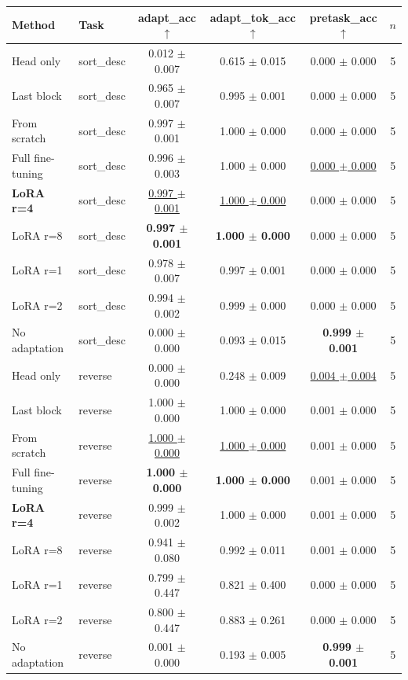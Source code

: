 \begin{tabular}{llcccc}
\toprule
Method & Task & adapt\_acc $\uparrow$ & adapt\_tok\_acc $\uparrow$ & pretask\_acc $\uparrow$ & $n$ \\
\midrule
Head only & sort\_desc & 0.012 $\pm$ 0.007 & 0.615 $\pm$ 0.015 & 0.000 $\pm$ 0.000 & 5 \\
Last block & sort\_desc & 0.965 $\pm$ 0.007 & 0.995 $\pm$ 0.001 & 0.000 $\pm$ 0.000 & 5 \\
From scratch & sort\_desc & 0.997 $\pm$ 0.001 & 1.000 $\pm$ 0.000 & 0.000 $\pm$ 0.000 & 5 \\
Full fine-tuning & sort\_desc & 0.996 $\pm$ 0.003 & 1.000 $\pm$ 0.000 & \underline{0.000 $\pm$ 0.000} & 5 \\
\textbf{LoRA r=4} & sort\_desc & \underline{0.997 $\pm$ 0.001} & \underline{1.000 $\pm$ 0.000} & 0.000 $\pm$ 0.000 & 5 \\
LoRA r=8 & sort\_desc & \textbf{0.997 $\pm$ 0.001} & \textbf{1.000 $\pm$ 0.000} & 0.000 $\pm$ 0.000 & 5 \\
LoRA r=1 & sort\_desc & 0.978 $\pm$ 0.007 & 0.997 $\pm$ 0.001 & 0.000 $\pm$ 0.000 & 5 \\
LoRA r=2 & sort\_desc & 0.994 $\pm$ 0.002 & 0.999 $\pm$ 0.000 & 0.000 $\pm$ 0.000 & 5 \\
No adaptation & sort\_desc & 0.000 $\pm$ 0.000 & 0.093 $\pm$ 0.015 & \textbf{0.999 $\pm$ 0.001} & 5 \\
\midrule
Head only & reverse & 0.000 $\pm$ 0.000 & 0.248 $\pm$ 0.009 & \underline{0.004 $\pm$ 0.004} & 5 \\
Last block & reverse & 1.000 $\pm$ 0.000 & 1.000 $\pm$ 0.000 & 0.001 $\pm$ 0.000 & 5 \\
From scratch & reverse & \underline{1.000 $\pm$ 0.000} & \underline{1.000 $\pm$ 0.000} & 0.001 $\pm$ 0.000 & 5 \\
Full fine-tuning & reverse & \textbf{1.000 $\pm$ 0.000} & \textbf{1.000 $\pm$ 0.000} & 0.001 $\pm$ 0.000 & 5 \\
\textbf{LoRA r=4} & reverse & 0.999 $\pm$ 0.002 & 1.000 $\pm$ 0.000 & 0.001 $\pm$ 0.000 & 5 \\
LoRA r=8 & reverse & 0.941 $\pm$ 0.080 & 0.992 $\pm$ 0.011 & 0.001 $\pm$ 0.000 & 5 \\
LoRA r=1 & reverse & 0.799 $\pm$ 0.447 & 0.821 $\pm$ 0.400 & 0.000 $\pm$ 0.000 & 5 \\
LoRA r=2 & reverse & 0.800 $\pm$ 0.447 & 0.883 $\pm$ 0.261 & 0.000 $\pm$ 0.000 & 5 \\
No adaptation & reverse & 0.001 $\pm$ 0.000 & 0.193 $\pm$ 0.005 & \textbf{0.999 $\pm$ 0.001} & 5 \\
\bottomrule
\end{tabular}
